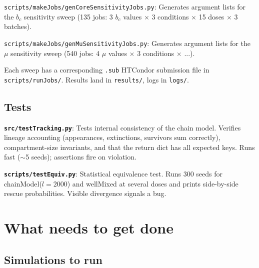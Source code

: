 \documentclass[12pt]{article}
\begin{document}
\texttt{scripts/makeJobs/genCoreSensitivityJobs.py}: Generates argument
lists for the $b_c$ sensitivity sweep (135 jobs: 3 $b_c$ values $\times$
3 conditions $\times$ 15 doses $\times$ 3 batches).

\texttt{scripts/makeJobs/genMuSensitivityJobs.py}: Generates argument
lists for the $\mu$ sensitivity sweep (540 jobs: 4 $\mu$ values $\times$
3 conditions $\times$ ...).

Each sweep has a corresponding \texttt{.sub} HTCondor submission file in
\texttt{scripts/runJobs/}. Results land in \texttt{results/}, logs in
\texttt{logs/}.

\subsection{Tests}

\textbf{\texttt{src/testTracking.py}}: Tests internal consistency of the
chain model. Verifies lineage accounting (appearances, extinctions,
survivors sum correctly), compartment-size invariants, and that the
return dict has all expected keys. Runs fast ($\sim$5 seeds); assertions
fire on violation.

\textbf{\texttt{scripts/testEquiv.py}}: Statistical equivalence test.
Runs 300 seeds for chainModel($l=2000$) and wellMixed at several doses
and prints side-by-side rescue probabilities. Visible divergence signals
a bug.


\section{What needs to get done}
\label{sec:todo}

\subsection{Simulations to run}
\end{document}
